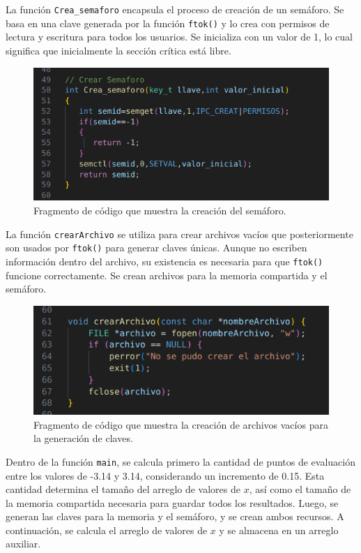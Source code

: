 {La función \texttt{Crea\_semaforo} encapsula el proceso de creación de un semáforo. Se basa en una clave generada por la función \texttt{ftok()} y lo crea con permisos de lectura y escritura para todos los usuarios. Se inicializa con un valor de 1, lo cual significa que inicialmente la sección crítica está libre.

\begin{figure}[H]
    \centering
    \includegraphics[width=0.9\linewidth]{Figures/codigo/semaforo.png}
    \caption[Creación del semáforo]{Fragmento de código que muestra la creación del semáforo.}
    \label{fig:semaforo}
\end{figure}

La función \texttt{crearArchivo} se utiliza para crear archivos vacíos que posteriormente son usados por \texttt{ftok()} para generar claves únicas. Aunque no escriben información dentro del archivo, su existencia es necesaria para que \texttt{ftok()} funcione correctamente. Se crean archivos para la memoria compartida y el semáforo.

\begin{figure}[H]
    \centering
    \includegraphics[width=0.9\linewidth]{Figures/codigo/crearArchivo.png}
    \caption[Creación de archivos vacíos]{Fragmento de código que muestra la creación de archivos vacíos para la generación de claves.}
    \label{fig:archivo_crear}
\end{figure}

Dentro de la función \texttt{main}, se calcula primero la cantidad de puntos de evaluación entre los valores de -3.14 y 3.14, considerando un incremento de 0.15. Esta cantidad determina el tamaño del arreglo de valores de \( x \), así como el tamaño de la memoria compartida necesaria para guardar todos los resultados. Luego, se generan las claves para la memoria y el semáforo, y se crean ambos recursos. A continuación, se calcula el arreglo de valores de \( x \) y se almacena en un arreglo auxiliar.

}
